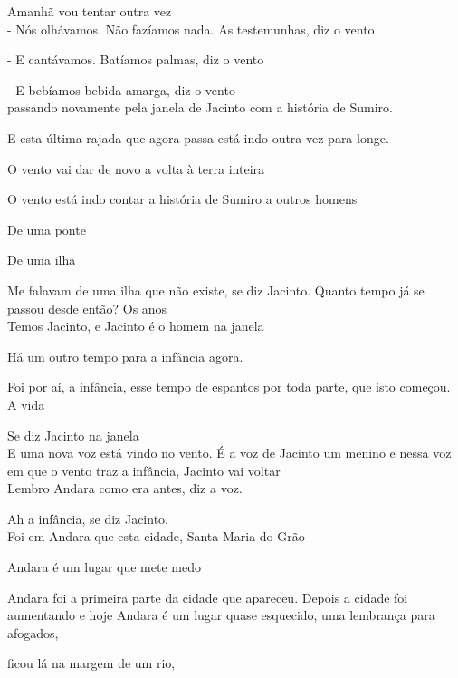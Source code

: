 Amanhã vou tentar outra vez\\

- Nós olhávamos. Não fazíamos nada. As testemunhas, diz o vento

- E cantávamos. Batíamos palmas, diz o vento

- E bebíamos bebida amarga, diz o vento\\

passando novamente pela janela de Jacinto com a história de Sumiro.

E esta última rajada que agora passa está indo outra vez para longe.

O vento vai dar de novo a volta à terra inteira

O vento está indo contar a história de Sumiro a outros homens

\pagebreak

\clearpage
\thispagestyle{empty}

\movetooddpage

De uma ponte

De uma ilha

Me falavam de uma ilha que não existe, se diz Jacinto. Quanto tempo já
se passou desde então? Os anos\\

Temos Jacinto, e Jacinto é o homem na janela

\pagebreak

Há um outro tempo para a infância agora.

Foi por aí, a infância, esse tempo de espantos por toda parte, que isto
começou. A vida

Se diz Jacinto na janela\\

E uma nova voz está vindo no vento. É a voz de Jacinto um menino e nessa
voz em que o vento traz a infância, Jacinto vai voltar\\

Lembro Andara como era antes, diz a voz.

Ah a infância, se diz Jacinto.\\

Foi em Andara que esta cidade, Santa Maria do Grão

Andara é um lugar que mete medo

Andara foi a primeira parte da cidade que apareceu. Depois a cidade foi
aumentando e hoje Andara é um lugar quase esquecido, uma lembrança para
afogados,

ficou lá na margem de um rio,


